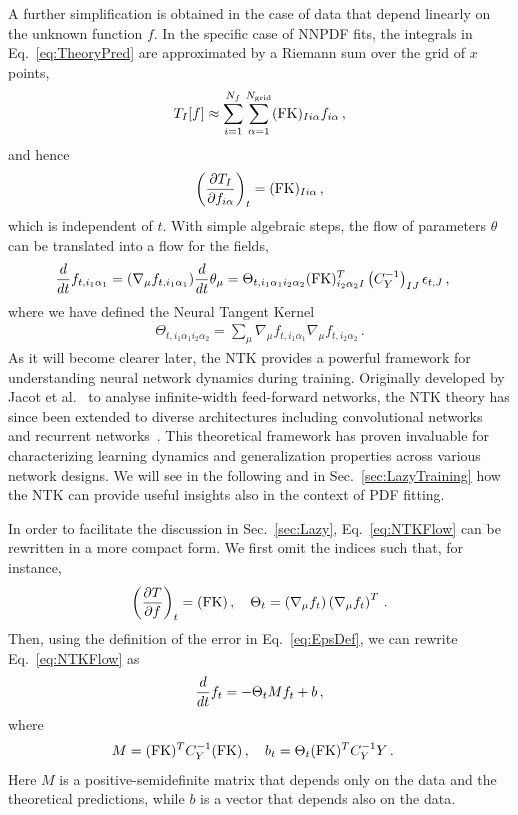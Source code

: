 A further simplification is obtained in the case of data that depend linearly on
the unknown function $f$. In the specific case of NNPDF fits, the integrals in
Eq.~\eqref{eq:TheoryPred} are approximated by a Riemann sum over the grid of $x$
points,
\begin{align}
    \label{eq:FKTabDef}
    T_I[f] \approx \sum_{i=1}^{N_{f}}\sum_{\alpha=1}^{N_{\mathrm{grid}}} (\mathrm{FK})_{Ii\alpha} f_{i\alpha}\, ,
\end{align}
and hence
\begin{align}
    \label{eq:dTbydf}
    \left(\frac{\partial T_I}{\partial f_{i\alpha}}\right)_t =
        (\mathrm{FK})_{Ii\alpha}\, ,
\end{align}
which is independent of $t$. With simple algebraic steps, the flow of parameters
$\theta$ can be translated into a flow for the fields,
\begin{align}
    \label{eq:NTKFlow}
    \frac{d}{dt} &f_{t,i_1\alpha_1} = (\nabla_\mu f_{t,i_1\alpha_1}) \frac{d}{dt} \theta_\mu =
      \Theta_{t,i_1\alpha_1i_2\alpha_2}
      (\mathrm{FK})^T_{i_2\alpha_2I} \left(C_Y^{-1}\right)_{IJ} \epsilon_{t,J}\, ,
\end{align}
where we have defined the Neural Tangent Kernel~\cite{jacot2018neural}
\begin{align}
    \label{eq:NTKDef}
    \Theta_{t,i_1\alpha_1i_2\alpha_2} = \sum_\mu
    \nabla_\mu f_{t,i_1\alpha_1} \nabla_\mu f_{t,i_2\alpha_2}\, .
\end{align}
As it will become clearer later, the NTK provides a powerful framework for
understanding neural network dynamics during training. Originally developed by
Jacot et al.~\cite{jacot2018neural} to analyse infinite-width feed-forward
networks, the NTK theory has since been extended to diverse architectures
including convolutional networks~\cite{arora2019exact} and recurrent
networks~\cite{alemohammad2021recurrent}. This theoretical framework has proven
invaluable for characterizing learning dynamics and generalization properties
across various network designs. We will see in the following and in
Sec.~\ref{sec:LazyTraining} how the NTK can provide useful insights also in the
context of PDF fitting.

In order to facilitate the discussion in Sec.~\ref{sec:Lazy},
Eq.~\eqref{eq:NTKFlow} can be rewritten in a more compact form. We first omit
the indices such that, for instance,
\begin{align}
  \left(\frac{\partial T}{\partial f}\right)_t = (\mathrm{FK})\, , \quad
  \Theta_t = \left(\nabla_\mu f_t\right) \left(\nabla_\mu f_t\right)^T\, .
  \label{eq:dTdfForLinearObs}
\end{align}
Then, using the definition of the error in Eq.~\eqref{eq:EpsDef}, we can rewrite
Eq.~\eqref{eq:NTKFlow} as 
\begin{align}
    \label{eq:FlowEquationNoIndices}
    \frac{d}{dt} f_t = -\Theta_t M f_t + b\, ,
\end{align}
where
\begin{align}
    M &= (\mathrm{FK})^T C_Y^{-1} (\mathrm{FK})\, , \quad b_t = \Theta_t (\mathrm{FK})^T C_Y^{-1} Y\, .
    \label{eq:MandBDef}
\end{align}
Here $M$ is a positive-semidefinite matrix that depends only on the data and the
theoretical predictions, while $b$ is a vector that depends also on the data.

